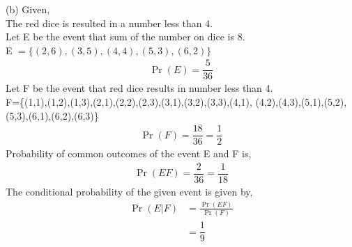 \documentclass[10pt,twocolumn]{article}
\providecommand{\pr}[1]{\ensuremath{\Pr\left(#1\right)}}
\begin{document}
\newpage
(b) Given, \vspace{0.1cm} \\
The red dice is resulted in a number less than 4. \vspace{0.2cm}\\
Let E be the event that sum of the number on dice is 8. \vspace{0.05cm}\\
E $ = \{( 2,6 ),( 3,5 ),( 4,4 ),( 5,3 ),( 6,2 )\}$
\begin{align}
\pr E =  \dfrac{5}{36} 
\end{align}
Let F be the event that red dice results in number less than 4. \vspace{0.05cm} \\
F=\{(1,1),(1,2),(1,3),(2,1),(2,2),(2,3),(3,1),(3,2),(3,3),(4,1),
(4,2),(4,3),(5,1),(5,2),(5,3),(6,1),(6,2),(6,3)\} 
\begin{align}
\pr F =  \dfrac{18}{36} = \dfrac{1}{2}
\end{align}
Probability of common outcomes of the event E and F is, 
\begin{align}
\pr {EF} =  \dfrac{2}{36} = \dfrac{1}{18}
\end{align}
The conditional probability of the given event is given by,
\begin{align}
\pr {E|F} &= \frac{\pr {EF}}{\pr F } \\
&= \dfrac{1}{9}
\end{align}
\end{document}
